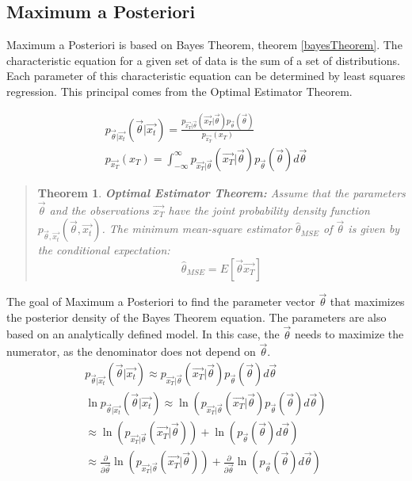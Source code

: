 \documentclass[12pt ]{article}
\newtheorem{thm}{Theorem}[section]
\begin{document}
\subsection{Maximum a Posteriori} 
Maximum a Posteriori is based on Bayes Theorem, theorem \ref{bayesTheorem}.  The characteristic equation for a given set of data is the sum of a set of distributions.   Each parameter of this characteristic equation can be determined by least squares regression.  This principal comes from the Optimal Estimator Theorem.  

\begin{eqnarray}
p_{\vec{\theta} | \vec{x_t}}(\vec{\theta} | \vec{x_t}) = \frac{p_{\vec{x_T} | \vec{\theta}}(\vec{x_T} | \vec{\theta}) p_{\vec{\theta}} (\vec{\theta})} { p_{\vec{x_T}} (x_T)  } \label{bayesTheorem}\\
p_{\vec{x_T}} (x_T)  = \int _{-\infty} ^{\infty} p_{\vec{x_T} | \vec{\theta}}(\vec{x_T} | \vec{\theta}) p_{\vec{\theta}} (\vec{\theta}) d\vec{\theta}
\end{eqnarray}


\begin{quote}
\begin{thm}
	\textbf{Optimal Estimator Theorem:} Assume that the parameters $\vec{\theta}$ and the observations $\vec{x_T}$ have the joint probability density function $p_{\vec{\theta} , \vec{x_t}}(\vec{\theta} , \vec{x_t})$.  The minimum mean-square estimator $\hat{\theta}_{MSE}$ of $\vec{\theta}$ is given by the conditional expectation:
\begin{equation}
\hat{\theta}_{MSE} = E[\vec{\theta} \vec{x_T}]
\end{equation}
\end{thm}
\cite[94]{appo-ica-book}
\end{quote}

The goal of Maximum a Posteriori to find the parameter vector $\vec{\theta}$ that maximizes the posterior density of the Bayes Theorem equation. The parameters are also based on an analytically defined model.  In this case, the $\vec{\theta}$ needs to maximize the numerator, as the denominator does not depend on $\vec{\theta}$.
\begin{eqnarray}
p_{\vec{\theta} | \vec{x_t}}(\vec{\theta} | \vec{x_t}) \approx p_{\vec{x_T} | \vec{\theta}}(\vec{x_T} | \vec{\theta}) p_{\vec{\theta}} (\vec{\theta}) d\vec{\theta} \\
\ln p_{\vec{\theta} | \vec{x_t}}(\vec{\theta} | \vec{x_t}) \approx \ln (p_{\vec{x_T} | \vec{\theta}}(\vec{x_T} | \vec{\theta}) p_{\vec{\theta}} (\vec{\theta}) d\vec{\theta}) \\
 \approx \ln( p_{\vec{x_T} | \vec{\theta}}(\vec{x_T} | \vec{\theta})) + \ln (p_{\vec{\theta}} (\vec{\theta}) d\vec{\theta} )\\
\approx 
\frac{\partial} {\partial \vec{\theta} } \ln( p_{\vec{x_T} | \vec{\theta}}(\vec{x_T} | \vec{\theta})) + \frac{\partial} {\partial \vec{\theta} } \ln (p_{\vec{\theta}} (\vec{\theta}) d\vec{\theta} ) \label{ln_bayes}
\end{eqnarray}
\end{document}
